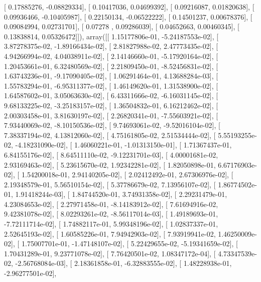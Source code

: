 \documentclass{article}
\begin{document}
       [ 0.17885276, -0.08829334],
       [ 0.10417036,  0.04699392],
       [ 0.09216087,  0.01820638],
       [ 0.09936466, -0.10405987],
       [ 0.22150134, -0.06522222],
       [ 0.14501237,  0.00678376],
       [ 0.09084994,  0.02731701],
       [ 0.07278   ,  0.09286039],
       [ 0.04652663,  0.00460345],
       [ 0.13838814,  0.05326472]]), array([[  1.15177806e-01,  -5.24187553e-02],
       [  3.87278375e-02,  -1.89166434e-02],
       [  2.81827988e-02,   2.47773435e-02],
       [  4.94266994e-02,   4.04038911e-02],
       [  2.14146660e-01,  -5.17920164e-02],
       [  1.20453661e-01,   6.32480569e-02],
       [  2.21809450e-01,  -8.52456831e-02],
       [  1.63743236e-01,  -9.17090405e-02],
       [  1.06291464e-01,   4.13688284e-03],
       [  1.55783294e-01,  -6.95311377e-02],
       [  1.46149620e-01,   1.31538900e-02],
       [  1.64587602e-01,   3.05063630e-02],
       [  6.43311666e-02,  -6.16031145e-02],
       [  9.68133225e-02,  -3.25183157e-02],
       [  1.36504832e-01,   6.16212462e-02],
       [  2.00303458e-01,   3.81630197e-02],
       [  2.26820341e-01,  -7.55603921e-02],
       [  7.93440069e-02,  -8.10150536e-02],
       [  9.74693061e-02,  -9.52016104e-02],
       [  7.38337194e-02,   4.13812060e-02],
       [  4.75161805e-02,   2.51534444e-02],
       [  5.55193255e-02,  -4.18231090e-02],
       [  1.46060221e-01,  -1.01313150e-01],
       [  1.71367437e-01,   6.84155176e-02],
       [  8.64511110e-02,  -9.12231701e-03],
       [  4.00001681e-02,   2.93169463e-02],
       [  5.23615670e-02,   1.92342281e-02],
       [  1.82050898e-01,   6.67176903e-02],
       [  1.54200018e-01,   2.94140205e-02],
       [  2.02412492e-01,   2.67306976e-02],
       [  2.19348579e-01,   5.56510154e-02],
       [  5.37786679e-02,   7.13956107e-02],
       [  1.86774502e-01,   1.91418244e-03],
       [  1.84744520e-01,   3.74931358e-02],
       [  2.29231479e-01,   4.23084653e-02],
       [  2.27971458e-01,  -8.14183912e-02],
       [  7.61694916e-02,   9.42381078e-02],
       [  8.02293261e-02,  -8.56117014e-03],
       [  1.49189693e-01,  -7.72111714e-02],
       [  1.74882117e-01,   5.99348196e-02],
       [  1.02837337e-01,   2.52645193e-02],
       [  1.60585226e-01,   7.94942903e-02],
       [  7.93919941e-02,   1.46250009e-02],
       [  1.75007701e-01,  -1.47148107e-02],
       [  5.22429655e-02,  -5.19341659e-02],
       [  1.70431289e-01,   9.23771078e-02],
       [  7.76420501e-02,   1.08347172e-04],
       [  4.73347539e-02,  -2.56768084e-03],
       [  2.18361858e-01,  -6.32883555e-02],
       [  1.48228938e-01,  -2.96277501e-02],
\end{document}
